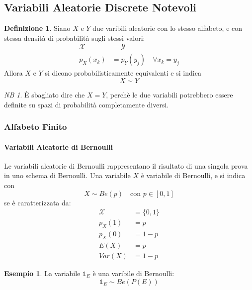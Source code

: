 \documentclass{article}
\theoremstyle{plain}
\theoremstyle{definition}
\newtheorem{definizione}{Definizione}[section]
\newtheorem{esempio}{Esempio}[section]
\theoremstyle{remark}
\newtheorem*{NB}{NB}
\begin{document}
\subsection{Variabili Aleatorie Discrete Notevoli} %
\label{sub:variabili_aleatorie_discrete_notevoli}
\begin{definizione}
	Siano $X$ e $Y$ due varibili aleatorie con lo stesso alfabeto, e con stessa densità di probabilità sugli stessi valori:
	\begin{align*}
		\mathcal{X}&=\mathcal{Y}\\
		p_X(x_k)&=p_Y(y_j)\quad\forall x_k=y_j
	\end{align*}
	Allora $X$ e $Y$ si dicono probabilisticamente equivalenti e si indica
	\begin{equation*}
		X\sim Y
	\end{equation*}
\end{definizione}
\begin{NB}
	È sbagliato dire che $X=Y$, perchè le due variabili potrebbero essere definite su spazi di probabilità completamente diversi.
\end{NB}
\subsubsection{Alfabeto Finito} %
\label{ssub:alfabeto_finito}
\paragraph{Variabili Aleatorie di Bernoulli} %
\label{par:variabili_aleatorie_di_bernoulli}
Le variabili aleatorie di Bernoulli rappresentano il risultato di una singola prova in uno schema di Bernoulli. Una variabile $X$ è variabile di Bernoulli, e si indica con
\begin{equation*}
	X\sim Be(p)\quad\text{con }p\in[0,1]
\end{equation*}
se è caratterizzata da:
\begin{align*}
	\mathcal{X}&=\{0,1\}\\
	p_X(1)&=p\\
	p_X(0)&=1-p\\
	E(X)&=p\\
	Var(X)&=1-p
\end{align*}
\begin{esempio}
	La variabile $\mathds{1}_E$ è una varibile di Bernoulli:
	\begin{equation*}
		\mathds{1}_E\sim Be(P(E))
	\end{equation*}
\end{esempio}
\end{document}
